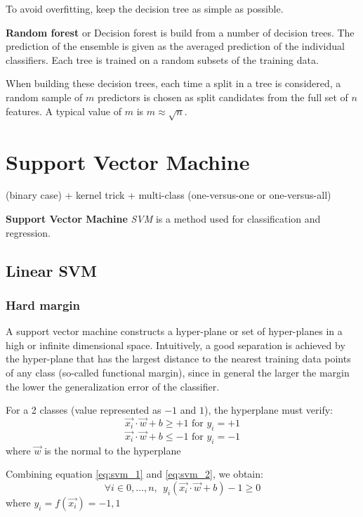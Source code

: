 To avoid overfitting, keep the decision tree as simple as possible.

\textbf{Random forest} or Decision forest is build from a number of decision trees. The prediction of the ensemble is given as the averaged prediction of the individual classifiers. Each tree is trained on a random subsets of the training data.

When building these decision trees, each time a split in a tree is considered, a random sample of
$m$ predictors is chosen as split candidates from the full set of $n$ features. A typical value of $m$ is $m \approx \sqrt{n}$.

\section{Support Vector Machine}

 (binary case) + kernel trick + multi-class (one-versus-one or one-versus-all)

\textbf{Support Vector Machine} \textit{SVM} is a method used for classification and regression.

\subsection{Linear SVM}
\subsubsection{Hard margin}

A support vector machine constructs a hyper-plane or set of hyper-planes in a high or infinite dimensional space. Intuitively, a good separation is achieved by the hyper-plane that has the largest distance to the nearest training data points of any class (so-called functional margin), since in general the larger the margin the lower the generalization error of the classifier.

For a 2 classes (value represented as $-1$ and $1$), the hyperplane must verify:
\begin{equation}\label{eq:svm_1}
    \vec{x_i} \cdot \vec{w} + b \geq + 1 \text{ for } y_i = + 1
\end{equation}
\begin{equation}\label{eq:svm_2}
    \vec{x_i} \cdot \vec{w} + b \leq -1 \text{ for } y_i = - 1
\end{equation}
where $\vec{w}$ is the normal to the hyperplane

Combining equation \ref{eq:svm_1} and \ref{eq:svm_2}, we obtain:
$$ \forall i \in {0, \ldots, n}, ~~ y_i (\vec{x_i} \cdot \vec{w} + b) - 1 \geq 0$$
where $y_i = f(\vec{x_i}) = {-1, 1}$

